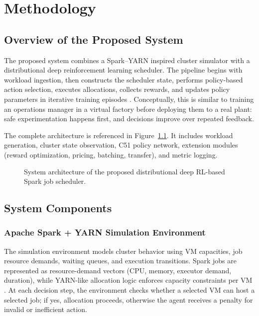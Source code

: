 \chapter{Methodology}
\label{chap:methodology}

\section{Overview of the Proposed System}
The proposed system combines a Spark--YARN inspired cluster simulator with a distributional deep reinforcement learning scheduler. The pipeline begins with workload ingestion, then constructs the scheduler state, performs policy-based action selection, executes allocations, collects rewards, and updates policy parameters in iterative training episodes \cite{sutton2018rl,bellemare2017distributional}. Conceptually, this is similar to training an operations manager in a virtual factory before deploying them to a real plant: safe experimentation happens first, and decisions improve over repeated feedback.

The complete architecture is referenced in Figure~\ref{fig:system_architecture}. It includes workload generation, cluster state observation, C51 policy network, extension modules (reward optimization, pricing, batching, transfer), and metric logging.

\begin{figure}[H]
\centering
{}
\caption{System architecture of the proposed distributional deep RL-based Spark job scheduler.}
\label{fig:system_architecture}
\end{figure}

\section{System Components}
\subsection{Apache Spark + YARN Simulation Environment}
The simulation environment models cluster behavior using VM capacities, job resource demands, waiting queues, and execution transitions. Spark jobs are represented as resource-demand vectors (CPU, memory, executor demand, duration), while YARN-like allocation logic enforces capacity constraints per VM \cite{vavilapalli2013apache}. At each decision step, the environment checks whether a selected VM can host a selected job; if yes, allocation proceeds, otherwise the agent receives a penalty for invalid or inefficient action.

